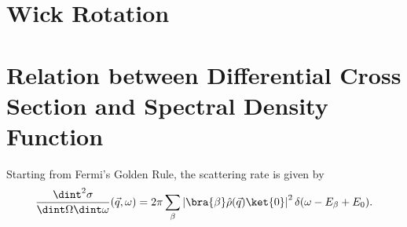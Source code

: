 \documentclass[a4paper,10pt]{report}
\begin{document}
\section{Wick Rotation}

\section{Relation between Differential Cross Section and Spectral Density Function}


Starting from Fermi's Golden Rule, the scattering rate is given by 
\begin{equation} \label{FGR}
 \frac{\dint^2 \sigma}{\dint \Omega \dint \omega}(\vec q, \omega) = 2\pi \sum_{\beta} \left| \bra{\beta} \hat \rho(\vec q) \ket{0}\right|^2 \delta(\omega - E_{\beta}+E_0).
\end{equation}



\end{document}
